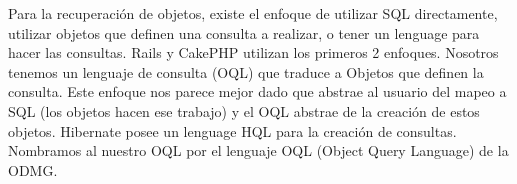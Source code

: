 \begin{itemize}
Para la recuperación de objetos, existe el enfoque de utilizar SQL directamente, utilizar objetos que definen una consulta a realizar, o tener un lenguage para hacer las consultas. Rails y CakePHP utilizan los primeros 2 enfoques. Nosotros tenemos un lenguaje de consulta (OQL) que traduce a Objetos que definen la consulta. Este enfoque nos parece mejor dado que abstrae al usuario del mapeo a SQL (los objetos hacen ese trabajo) y el OQL abstrae de la creación de estos objetos. Hibernate posee un lenguage HQL para la creación de consultas. Nombramos al nuestro OQL por el lenguaje OQL (Object Query Language) \cite{OQL} de la ODMG.







\end{itemize}